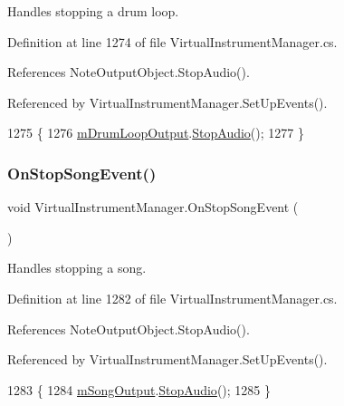 Handles stopping a drum loop. 



Definition at line 1274 of file Virtual\+Instrument\+Manager.\+cs.



References Note\+Output\+Object.\+Stop\+Audio().



Referenced by Virtual\+Instrument\+Manager.\+Set\+Up\+Events().


\begin{DoxyCode}
1275     \{
1276         \hyperlink{group___v_i_m_priv_ga5f71cb71d240042312dcc13b481b068d}{mDrumLoopOutput}.\hyperlink{group___n_o_o_pub_func_gae8a8e5bc027fd0186464a68399a4fecb}{StopAudio}();
1277     \}
\end{DoxyCode}
\mbox{\label{group___v_i_m_handlers_ga5d9afb7a74107b5c6016555f0bb0a0a8}} 
\subsubsection{\texorpdfstring{On\+Stop\+Song\+Event()}{OnStopSongEvent()}}
{\footnotesize\ttfamily void Virtual\+Instrument\+Manager.\+On\+Stop\+Song\+Event (\begin{DoxyParamCaption}{ }\end{DoxyParamCaption})}



Handles stopping a song. 



Definition at line 1282 of file Virtual\+Instrument\+Manager.\+cs.



References Note\+Output\+Object.\+Stop\+Audio().



Referenced by Virtual\+Instrument\+Manager.\+Set\+Up\+Events().


\begin{DoxyCode}
1283     \{
1284         \hyperlink{group___v_i_m_priv_gaa8d4f5642f5ac4dca4f4178b0052c78d}{mSongOutput}.\hyperlink{group___n_o_o_pub_func_gae8a8e5bc027fd0186464a68399a4fecb}{StopAudio}();
1285     \}
\end{DoxyCode}
